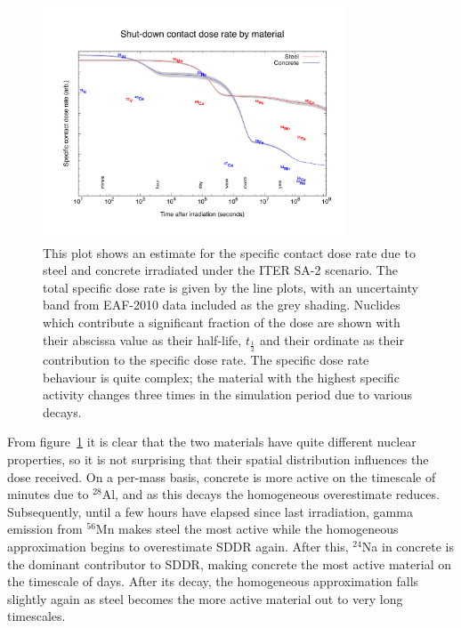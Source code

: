 \begin{figure}[H]
  \centering
  \includegraphics[width=0.8\textwidth]{contact_dose_by_mat}
  \caption[Contact dose rates as a function of time for concrete and steel.]{This plot shows an estimate for the specific contact dose rate due to steel and concrete irradiated under the ITER SA-2 scenario. The total specific dose rate is given by the line plots, with an uncertainty band from EAF-2010 data included as the grey shading. Nuclides which contribute a significant fraction of the dose are shown with their abscissa value as their half-life, $t_{\frac{1}{2}}$ and their ordinate as their contribution to the specific dose rate. The specific dose rate behaviour is quite complex; the material with the highest specific activity changes three times in the simulation period due to various decays.}
  \label{fig:contact_dose}
\end{figure}

From figure~\ref{fig:contact_dose} it is clear that the two materials have quite different nuclear properties, so it is not surprising that their spatial distribution influences the dose received. On a per-mass basis, concrete is more active on the timescale of minutes due to $^{28}$Al, and as this decays the homogeneous overestimate reduces. Subsequently, until a few hours have elapsed since last irradiation, gamma emission from $^{56}$Mn makes steel the most active while the homogeneous approximation begins to overestimate SDDR again. After this, $^{24}$Na in concrete is the dominant contributor to SDDR, making concrete the most active material on the timescale of days. After its decay, the homogeneous approximation falls slightly again as steel becomes the more active material out to very long timescales. 

